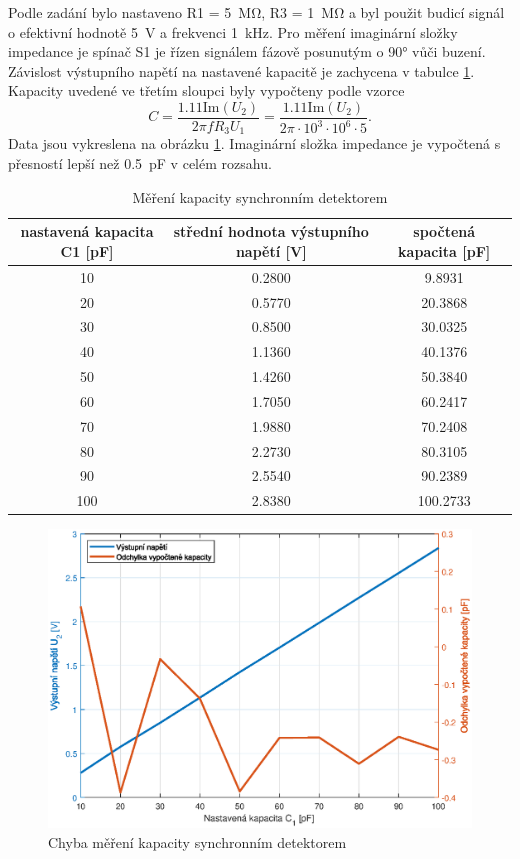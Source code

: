 \documentclass[twoside]{article}
\begin{document}
Podle zadání bylo nastaveno R1 = \SI{5}{\mega\ohm}, R3 = \SI{1}{\mega\ohm}
a byl použit
budicí signál o efektivní hodnotě \SI{5}{\volt} a frekvenci \SI{1}{\kilo\hertz}.
Pro měření imaginární složky impedance je spínač S1 je řízen signálem fázově posunutým o 90° vůči buzení.
Závislost výstupního napětí na nastavené kapacitě je zachycena v tabulce \ref{tab-c}.
Kapacity uvedené ve třetím sloupci byly vypočteny podle vzorce
\begin{equation}
    C =\frac{1.11 \text{Im}(U_2)}{2\pi f R_3 U_1} = \frac{1.11 \text{Im}(U_2)}{2\pi \cdot 10^3 \cdot 10^6\cdot 5}.
\end{equation}
Data jsou vykreslena na obrázku \ref{mereni-c}. Imaginární složka impedance je vypočtená
s přesností lepší než \SI{0.5}{\pico\farad} v celém rozsahu.

\begin{table}[h]
    \centering
    \begin{tabular}{c|c|c}
        nastavená kapacita C1 [pF] & střední hodnota výstupního napětí [V] & spočtená kapacita [pF] \\\hline
        10 & 0.2800 &   9.8931 \\
        20 & 0.5770 &  20.3868 \\
        30 & 0.8500 &  30.0325 \\
        40 & 1.1360 &  40.1376 \\
        50 & 1.4260 &  50.3840 \\
        60 & 1.7050 &  60.2417 \\
        70 & 1.9880 &  70.2408 \\
        80 & 2.2730 &  80.3105 \\
        90 & 2.5540 &  90.2389 \\
       100 & 2.8380 & 100.2733 \\
    \end{tabular}
    \caption{Měření kapacity synchronním detektorem}
    \label{tab-c}
\end{table}

\begin{figure}[h]
    \centering
    \includegraphics[width=\textwidth]{mereni-c.eps}
    \caption{Chyba měření kapacity synchronním detektorem}
    \label{mereni-c}
\end{figure}
\end{document}
